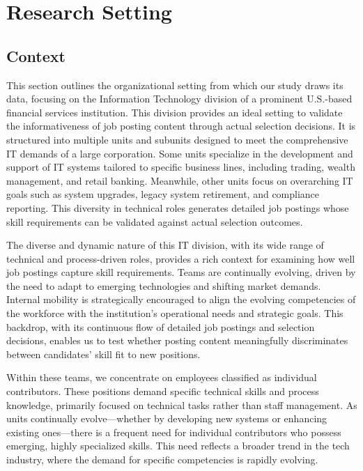 \documentclass[12pt]{article}
\begin{document}
\section{Research Setting}\label{sec:research_setting}


\subsection{Context}


This section outlines the organizational setting from which our study draws its data, focusing on the Information Technology division of a prominent U.S.-based financial services institution. This division provides an ideal setting to validate the informativeness of job posting content through actual selection decisions. It is structured into multiple units and subunits designed to meet the comprehensive IT demands of a large corporation. Some units specialize in the development and support of IT systems tailored to specific business lines, including trading, wealth management, and retail banking. Meanwhile, other units focus on overarching IT goals such as system upgrades, legacy system retirement, and compliance reporting. This diversity in technical roles generates detailed job postings whose skill requirements can be validated against actual selection outcomes.



The diverse and dynamic nature of this IT division, with its wide range of technical and process-driven roles, provides a rich context for examining how well job postings capture skill requirements. Teams are continually evolving, driven by the need to adapt to emerging technologies and shifting market demands. Internal mobility is strategically encouraged to align the evolving competencies of the workforce with the institution's operational needs and strategic goals. This backdrop, with its continuous flow of detailed job postings and selection decisions, enables us to test whether posting content meaningfully discriminates between candidates' skill fit to new positions.


Within these teams, we concentrate on employees classified as individual contributors. These positions demand specific technical skills and process knowledge, primarily focused on technical tasks rather than staff management. As units continually evolve—whether by developing new systems or enhancing existing ones—there is a frequent need for individual contributors who possess emerging, highly specialized skills. This need reflects a broader trend in the tech industry, where the demand for specific competencies is rapidly evolving.
\end{document}

